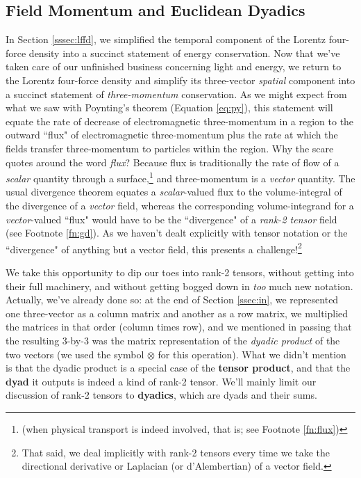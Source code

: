 \documentclass[12pt]{article}
\begin{document}
\subsection{Field Momentum and Euclidean Dyadics}\label{sssec:emm}

In Section \ref{sssec:lffd}, we simplified the temporal component of the Lorentz four-force density into a succinct statement of energy conservation. Now that we've taken care of our unfinished business concerning light and energy, we return to the Lorentz four-force density and simplify its three-vector \emph{spatial} component into a succinct statement of \emph{three-momentum} conservation. As we might expect from what we saw with Poynting's theorem (Equation \ref{eq:py}), this statement will equate the rate of decrease of electromagnetic three-momentum in a region to the outward ``flux" of electromagnetic three-momentum plus the rate at which the fields transfer three-momentum to particles within the region. Why the scare quotes around the word \emph{flux}? Because flux is traditionally the rate of flow of a \emph{scalar} quantity through a surface,\footnote{(when physical transport is indeed involved, that is; see Footnote \ref{fn:flux})} and three-momentum is a \emph{vector} quantity. The usual divergence theorem equates a \emph{scalar}-valued flux to the volume-integral of the divergence of a \emph{vector} field, whereas the corresponding volume-integrand for a \emph{vector}-valued ``flux" would have to be the ``divergence" of a \emph{rank-2 tensor} field (see Footnote \ref{fn:gd}). As we haven't dealt explicitly with tensor notation or the ``divergence" of anything but a vector field, this presents a challenge!\footnote{That said, we deal implicitly with rank-2 tensors every time we take the directional derivative or Laplacian (or d'Alembertian) of a vector field.}

We take this opportunity to dip our toes into rank-2 tensors, without getting into their full machinery, and without getting bogged down in \emph{too} much new notation. Actually, we've already done so: at the end of Section \ref{ssec:in}, we represented one three-vector as a column matrix and another as a row matrix, we multiplied the matrices in that order (column times row), and we mentioned in passing that the resulting 3-by-3 was the matrix representation of the \emph{dyadic product} of the two vectors (we used the symbol $\otimes$ for this operation). What we didn't mention is that the dyadic product is a special case of the \textbf{tensor product}, and that the \textbf{dyad} it outputs is indeed a kind of rank-2 tensor. We'll mainly limit our discussion of rank-2 tensors to \textbf{dyadics}, which are dyads and their sums.
\end{document}
